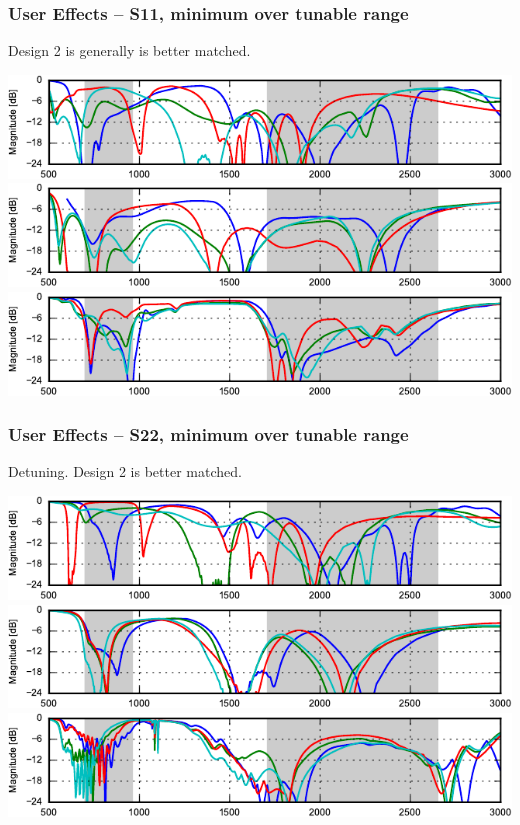 \begin{frame}
    \frametitle{User Effects -- S11, minimum over tunable range}
    Design 2 is generally is better matched.
    \begin{center}
        \includegraphics{img/soren/ue/design1lt/s11top.pdf}\\
        \includegraphics{img/soren/ue/design2sn/s11top.pdf}\\
        \includegraphics{img/soren/ue/design3hv/s11top.pdf}
    \end{center}
    \legendfooter
\end{frame}

\begin{frame}
    \frametitle{User Effects -- S22, minimum over tunable range}
    Detuning. Design 2 is better matched.
    \begin{center}
        \includegraphics{img/soren/ue/design1lt/s22side.pdf}\\
        \includegraphics{img/soren/ue/design2sn/s22side.pdf}\\
        \includegraphics{img/soren/ue/design3hv/s22side.pdf}
    \end{center}
    \legendfooter
\end{frame}

